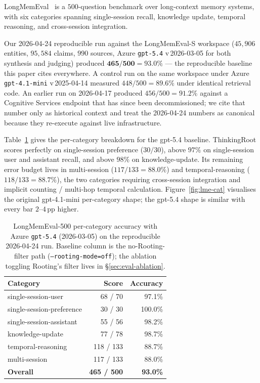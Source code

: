 \documentclass[10pt,a4paper]{article}
\begin{document}
LongMemEval~\cite{wu2024longmemeval} is a $500$-question benchmark over
long-context memory systems, with six categories spanning single-session
recall, knowledge update, temporal reasoning, and cross-session
integration.

Our 2026-04-24 reproducible run against the LongMemEval-S workspace
($45{,}906$ entities, $95{,}584$ claims, $990$ sources, Azure
\texttt{gpt-5.4} v\,2026-03-05 for both synthesis and judging) produced
$\mathbf{465/500 = 93.0\%}$ --- the reproducible baseline this paper
cites everywhere. A control run on the same workspace under Azure
\texttt{gpt-4.1-mini} v\,2025-04-14 measured $448/500 = 89.6\%$ under
identical retrieval code. An earlier run on 2026-04-17 produced
$456/500 = 91.2\%$ against a Cognitive Services endpoint that has
since been decommissioned; we cite that number only as historical
context and treat the 2026-04-24 numbers as canonical because they
re-execute against live infrastructure.

Table~\ref{tab:lme-category} gives the per-category breakdown for the
gpt-5.4 baseline. ThinkingRoot scores perfectly on single-session
preference ($30/30$), above $97\%$ on single-session user and
assistant recall, and above $98\%$ on knowledge-update. Its remaining
error budget lives in multi-session ($117/133 = 88.0\%$) and
temporal-reasoning ($118/133 = 88.7\%$), the two categories requiring
cross-session integration and implicit counting / multi-hop temporal
calculation. Figure~\ref{fig:lme-cat} visualises the original
gpt-4.1-mini per-category shape; the gpt-5.4 shape is similar with
every bar $2$--$4$\,pp higher.

\begin{table}[t]
\centering
\small
\caption{LongMemEval-500 per-category accuracy with Azure \texttt{gpt-5.4}
(2026-03-05) on the reproducible 2026-04-24 run. Baseline column is the
no-Rooting-filter path (\texttt{--rooting-mode=off}); the ablation
toggling Rooting's filter lives in \S\ref{sec:eval-ablation}.}
\label{tab:lme-category}
\begin{tabular}{@{}lrr@{}}
\toprule
Category & Score & Accuracy \\
\midrule
single-session-user        & 68 / 70   & 97.1\% \\
single-session-preference  & 30 / 30   & 100.0\% \\
single-session-assistant   & 55 / 56   & 98.2\% \\
knowledge-update           & 77 / 78   & 98.7\% \\
temporal-reasoning         & 118 / 133 & 88.7\% \\
multi-session              & 117 / 133 & 88.0\% \\
\midrule
\textbf{Overall}           & \textbf{465 / 500} & \textbf{93.0\%} \\
\bottomrule
\end{tabular}
\end{table}
\end{document}
